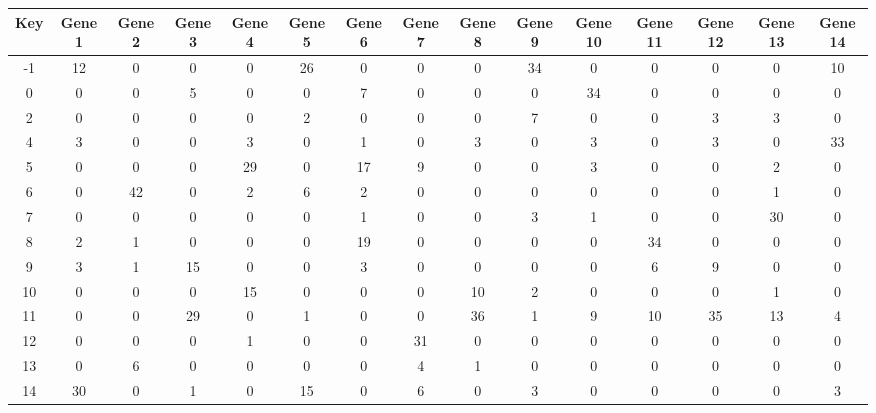 \begin{tabular}{|c|c|c|c|c|c|c|c|c|c|c|c|c|c|c|}
\hline
Key & Gene 1 & Gene 2 & Gene 3 & Gene 4 & Gene 5 & Gene 6 & Gene 7 & Gene 8 & Gene 9 & Gene 10 & Gene 11 & Gene 12 & Gene 13 & Gene 14 \\
\hline
-1 & 12 & 0 & 0 & 0 & 26 & 0 & 0 & 0 & 34 & 0 & 0 & 0 & 0 & 10 \\
0 & 0 & 0 & 5 & 0 & 0 & 7 & 0 & 0 & 0 & 34 & 0 & 0 & 0 & 0 \\
2 & 0 & 0 & 0 & 0 & 2 & 0 & 0 & 0 & 7 & 0 & 0 & 3 & 3 & 0 \\
4 & 3 & 0 & 0 & 3 & 0 & 1 & 0 & 3 & 0 & 3 & 0 & 3 & 0 & 33 \\
5 & 0 & 0 & 0 & 29 & 0 & 17 & 9 & 0 & 0 & 3 & 0 & 0 & 2 & 0 \\
6 & 0 & 42 & 0 & 2 & 6 & 2 & 0 & 0 & 0 & 0 & 0 & 0 & 1 & 0 \\
7 & 0 & 0 & 0 & 0 & 0 & 1 & 0 & 0 & 3 & 1 & 0 & 0 & 30 & 0 \\
8 & 2 & 1 & 0 & 0 & 0 & 19 & 0 & 0 & 0 & 0 & 34 & 0 & 0 & 0 \\
9 & 3 & 1 & 15 & 0 & 0 & 3 & 0 & 0 & 0 & 0 & 6 & 9 & 0 & 0 \\
10 & 0 & 0 & 0 & 15 & 0 & 0 & 0 & 10 & 2 & 0 & 0 & 0 & 1 & 0 \\
11 & 0 & 0 & 29 & 0 & 1 & 0 & 0 & 36 & 1 & 9 & 10 & 35 & 13 & 4 \\
12 & 0 & 0 & 0 & 1 & 0 & 0 & 31 & 0 & 0 & 0 & 0 & 0 & 0 & 0 \\
13 & 0 & 6 & 0 & 0 & 0 & 0 & 4 & 1 & 0 & 0 & 0 & 0 & 0 & 0 \\
14 & 30 & 0 & 1 & 0 & 15 & 0 & 6 & 0 & 3 & 0 & 0 & 0 & 0 & 3 \\
\hline
\end{tabular}